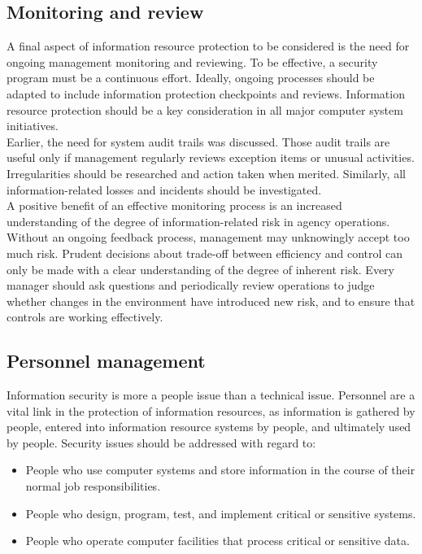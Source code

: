 \subsection{Monitoring and review}
A final aspect of information resource protection to be considered is
the need for ongoing management monitoring and reviewing. To be
effective, a security program must be a continuous effort. Ideally,
ongoing processes should be adapted to include information protection
checkpoints and reviews. Information resource protection should be a
key consideration in all major computer system initiatives.\\

Earlier, the need for system audit trails was discussed. Those audit
trails are useful only if management regularly reviews exception items
or unusual activities. Irregularities should be researched and action
taken when merited. Similarly, all information-related losses and
incidents should be investigated.\\

A positive benefit of an effective monitoring process is an increased
understanding of the degree of information-related risk in agency
operations. Without an ongoing feedback process, management may
unknowingly accept too much risk. Prudent decisions about trade-off
between efficiency and control can only be made with a clear
understanding of the degree of inherent risk. Every manager should ask
questions and periodically review operations to judge whether changes
in the environment have introduced new risk, and to ensure that
controls are working effectively.


\subsection{Personnel management}
Information security is more a people issue than a technical issue.
Personnel are a vital link in the protection of information resources,
as information is gathered by people, entered into information resource
systems by people, and ultimately used by people. Security issues
should be addressed with regard to:
\begin{itemize}
  \item People who use computer systems and store information in the
        course of their normal job responsibilities.
  \item People who design, program, test, and implement critical or
        sensitive systems.
  \item People who operate computer facilities that process critical or
        sensitive data.
\end{itemize}


